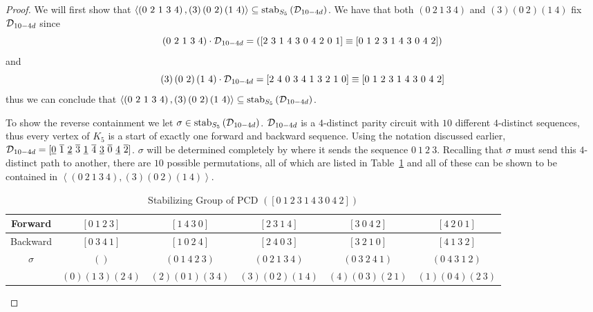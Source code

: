 \begin{proof}
\noindent
We will first show that $\left< \left(0\ 2\ 1\ 3\ 4\right),\left(3\right)\left(0\ 2\right)\left(1\ 4\right)\right> \subseteq \stab{S_5}{\pcd_{10-4d}}$. We have that both $\left(0\ 2\ 1\ 3\ 4\right)$ and $\left(3\right)\left(0\ 2\right)\left(1\ 4\right)$ fix $\operatorname{\mathcal{D}}_{10-4d}$ since
\[
\acts{\left(0\ 2\ 1\ 3\ 4\right)}{\pcd_{10-4d}} = \left(\left[2\ 3\ 1\ 4\ 3\ 0\ 4\ 2\ 0\ 1\right] \equiv \left[0\ 1\ 2\ 3\ 1\ 4\ 3\ 0\ 4\ 2\right]\right)
\] and
\[
\acts{\left(3\right)\left(0\ 2\right)\left(1\ 4\right)}{\pcd_{10-4d}} = \left[2\ 4\ 0\ 3\ 4\ 1\ 3\ 2\ 1\ 0 \right] \equiv \left[0\ 1\ 2\ 3\ 1\ 4\ 3\ 0\ 4\ 2\right]
\] thus we can conclude that $\left<\left(0\ 2\ 1\ 3\ 4\right),\left(3\right)\left(0\ 2\right)\left(1\ 4\right)\right> \subseteq \stab{S_5}{\pcd_{10-4d}}$.  


To show the reverse containment we let $\sigma \in \operatorname{\mathrm{stab}}_{S_5}\left(\operatorname{\mathcal{D}}_{10-4d} \right)$. $\operatorname{\mathcal{D}}_{10-4d}$ is a $4$-distinct parity circuit with $10$ different $4$-distinct sequences, thus every vertex of $K_5$ is a start of exactly one forward and backward sequence. Using the notation discussed earlier, $\pcd_{10-4d} = [\underline{0}\  \overline{1}\  \underline{2}\  \overline{3}\  \underline{1}\  \overline{4}\  \underline{3}\  \overline{0}\  \underline{4}\ \overline{2} ]$. $\sigma$ will be determined completely by where it sends the sequence $0\ 1\ 2\ 3$. Recalling that $\sigma$ must send this $4$-distinct path to another, there are $10$ possible permutations, all of which are listed in Table~\ref{tbl:4dpcdstab} and all of these can be shown to be contained in $\left< \left(0\ 2\ 1\ 3\ 4\right),\left(3\right)\left(0\ 2\right)\left(1\ 4\right)\right>$. 

\begin{table}[h]
  \caption{Stabilizing Group of PCD $\left([0\ 1\ 2\ 3\ 1\ 4\ 3\ 0\ 4\ 2]\right)$}
  \label{tbl:4dpcdstab}
  \vspace{1ex}
  \centering
  \begin{tabular}[h!]{ | c | c | c | c| c | c|}
\hline
Forward & $[0\ 1\ 2\ 3]$& $[1\ 4\ 3\ 0]$ & $[2\ 3\ 1\ 4]$ & $[3\ 0\ 4\ 2]$ & $[4\ 2 \ 0\ 1]$ \\
\hline
Backward & $[0\ 3\ 4\ 1]$& $[1\ 0\ 2\ 4]$  & $[2\ 4\ 0\ 3]$ & $[3\ 2\ 1\ 0]$ & $[4\ 1\ 3\ 2]$ \\
\hline
 $\sigma$& $()$ & $(0\ 1\ 4\ 2\ 3)$ &   $(0\ 2\ 1\ 3\ 4)$& $(0\ 3\ 2\ 4\ 1)$ & $(0\ 4\ 3\ 1\ 2)$   \\
        & $(0)(1\ 3)(2\ 4)$  & $(2)(0\ 1)(3\ 4)$  & $(3)(0\ 2)(1\ 4)$ & $(4)(0\ 3)(2\ 1)$ &$(1)(0\ 4)(2\ 3)$  \\
\hline
  \end{tabular}
\end{table}


\end{proof}
